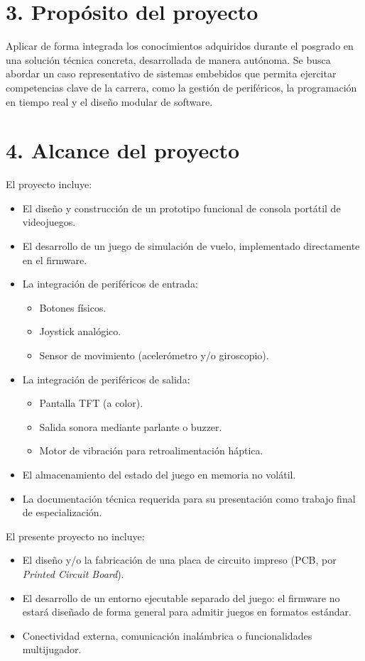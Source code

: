 \documentclass[
11pt, %
]{charter}
\begin{document}
\section{3. Propósito del proyecto}
\label{sec:proposito}

Aplicar de forma integrada los conocimientos adquiridos durante el posgrado en una solución técnica concreta, desarrollada de manera autónoma. Se busca abordar un caso representativo de sistemas embebidos que permita ejercitar competencias clave de la carrera, como la gestión de periféricos, la programación en tiempo real y el diseño modular de software. 


\section{4. Alcance del proyecto}
\label{sec:alcance}

El proyecto incluye:
\begin{itemize}
	\item El diseño y construcción de un prototipo funcional de consola portátil de videojuegos.
	\item El desarrollo de un juego de simulación de vuelo, implementado directamente en el firmware.
	\item La integración de periféricos de entrada:
		\begin{itemize}
		\item Botones físicos.
		\item Joystick analógico.
		\item Sensor de movimiento (acelerómetro y/o giroscopio).
		\end{itemize}
	\item La integración de periféricos de salida:
		\begin{itemize}
		\item Pantalla TFT (a color).
		\item Salida sonora mediante parlante o buzzer.
		\item Motor de vibración para retroalimentación háptica.
		\end{itemize}
	\item El almacenamiento del estado del juego en memoria no volátil.
	\item La documentación técnica requerida para su presentación como trabajo final de especialización.
\end{itemize}
El presente proyecto no incluye:
\begin{itemize}
	\item El diseño y/o la fabricación de una placa de circuito impreso (PCB, por \textit{Printed Circuit Board}).
	\item El desarrollo de un entorno ejecutable separado del juego: el firmware no estará diseñado de forma general para admitir juegos en formatos estándar.
	\item Conectividad externa, comunicación inalámbrica o funcionalidades multijugador.
\end{itemize}
\end{document}
